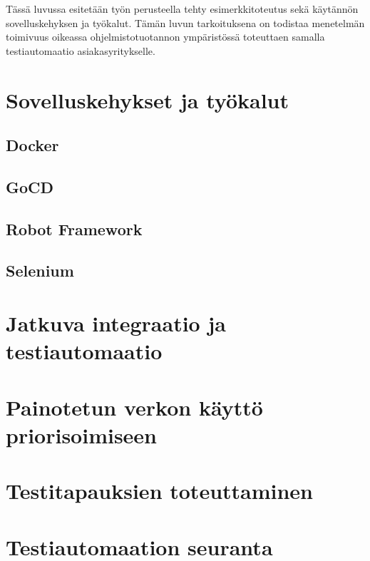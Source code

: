 Tässä luvussa esitetään työn perusteella tehty esimerkkitoteutus sekä käytännön sovelluskehyksen ja työkalut.
Tämän luvun tarkoituksena on todistaa menetelmän toimivuus oikeassa ohjelmistotuotannon ympäristössä toteuttaen samalla testiautomaatio asiakasyritykselle.

\section{Sovelluskehykset ja työkalut}

  \subsection{Docker}

  \subsection{GoCD}

  \subsection{Robot Framework}

  \subsection{Selenium}

\section{Jatkuva integraatio ja testiautomaatio}

\section{Painotetun verkon käyttö priorisoimiseen}

\section{Testitapauksien toteuttaminen}

\section{Testiautomaation seuranta}
